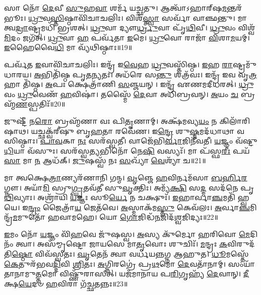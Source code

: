 𑌸𑌾 𑌨𑍋᳴ \ul{𑌦𑍇}\-𑌵𑍀 \ul{𑌸𑍁}\-𑌹\-\ul{𑌵𑌾} 𑌶𑌰𑍍𑌮᳴ 𑌯𑌚𑍍𑌛𑌤𑍁।
𑌆𑌤𑍍𑌵𑌾᳴\-𑌽𑌹𑌾𑌰𑍍‌\mbox{}𑌷\-\ul{𑌮}\-𑌨𑍍𑌤𑌰᳴𑌭𑍂𑌃।
\-\ul{𑌧𑍍𑌰𑍁}\-𑌵\-\ul{𑌸𑍍𑌤𑌿}\-𑌷𑍍𑌠𑌾𑌵𑌿᳴𑌚𑌾𑌚𑌲𑌿𑌃।
𑌵𑌿𑌶᳴\-\ul{𑌸𑍍𑌤𑍍𑌵𑌾} 𑌸𑌰𑍍𑌵𑌾᳴ 𑌵𑌾𑌞𑍍𑌛𑌨𑍍𑌤𑍁।
𑌮𑌾 𑌤𑍍𑌵\-\ul{𑌦𑍍𑌰𑌾}\-𑌷𑍍𑌟𑍍𑌰𑌮𑌧𑌿᳴ 𑌭𑍍𑌰𑌶𑌤𑍍।
\-\ul{𑌧𑍍𑌰𑍁}\-𑌵𑌾 𑌦𑍍𑌯𑍗\-\ul{𑌰𑍍𑌧𑍍𑌰𑍁}\-𑌵𑌾 𑌪𑍃᳴\-\ul{𑌥𑌿}\-𑌵𑍀।
\-\ul{𑌧𑍍𑌰𑍁}\-𑌵𑌂 𑌵𑌿𑌶𑍍𑌵᳴\-\ul{𑌮𑌿}\-𑌦𑌂 𑌜𑌗᳴𑌤𑍍।
\-\ul{𑌧𑍍𑌰𑍁}\-𑌵𑌾 \ul{𑌹} 𑌪𑌰𑍍𑌵᳴𑌤𑌾 \ul{𑌇}\-𑌮𑍇।
\-\ul{𑌧𑍍𑌰𑍁}\-𑌵𑍋 𑌰𑌾𑌜𑌾᳴ \ul{𑌵𑌿}\-𑌶𑌾\-\ul{𑌮}\-𑌯𑌮𑍍।
\-\ul{𑌇}\-𑌹𑍈𑌵𑍈\-\ul{𑌧𑌿} 𑌮𑌾 𑌵𑍍𑌯᳴𑌥𑌿𑌷𑍍𑌠𑌾𑌃॥19॥

𑌪𑌰𑍍𑌵᳴𑌤 \ul{𑌇}\-𑌵𑌾𑌵𑌿᳴𑌚𑌾𑌚𑌲𑌿𑌃।
𑌇𑌨𑍍𑌦𑍍𑌰᳴ 𑌇\-\ul{𑌵𑍇}\-𑌹 \ul{𑌧𑍍𑌰𑍁}\-𑌵𑌸𑍍𑌤𑌿᳴𑌷𑍍𑌠।
\-\ul{𑌇}\-𑌹 \ul{𑌰𑌾}\-𑌷𑍍𑌟𑍍𑌰𑌮𑍁᳴ 𑌧𑌾𑌰𑌯।
\-\ul{𑌅}\-𑌭𑌿𑌤𑌿᳴𑌷𑍍𑌠 𑌪𑍃𑌤\-\ul{𑌨𑍍𑌯}\-𑌤𑌃।
𑌅𑌧᳴𑌰𑍇 𑌸\-\ul{𑌨𑍍𑌤𑍁} 𑌶𑌤𑍍𑌰᳴𑌵𑌃।
𑌇𑌨𑍍𑌦𑍍𑌰᳴ 𑌇𑌵 𑌵𑍃\-\ul{𑌤𑍍𑌰}\-𑌹𑌾 𑌤𑌿᳴𑌷𑍍𑌠।
\-\ul{𑌅}\-𑌪𑌃 𑌕𑍍𑌷𑍇𑌤𑍍𑌰𑌾᳴𑌣𑌿 \ul{𑌸}\-𑌞𑍍𑌜𑌯𑌨𑍍।
𑌇𑌨𑍍𑌦𑍍𑌰᳴ 𑌏𑌣𑌮𑌦𑍀𑌧𑌰𑌤𑍍।
\-\ul{𑌧𑍍𑌰𑍁}\-𑌵𑌂 \ul{𑌧𑍍𑌰𑍁}\-𑌵𑍇𑌣᳴ \ul{𑌹}\-𑌵𑌿𑌷𑌾॑।
𑌤𑌸𑍍𑌮𑍈᳴ \ul{𑌦𑍇}\-𑌵𑌾 𑌅𑌧𑌿᳴𑌬𑍍𑌰𑌵𑌨𑍍।
\-\ul{𑌅}\-𑌯𑌂 \ul{𑌚} 𑌬𑍍𑌰𑌹𑍍𑌮᳴\-\ul{𑌣}\-𑌸𑍍𑌪𑌤𑌿𑌃᳴॥20॥\anuvakamend[\-\ul{𑌹}\-𑌵𑌿𑌰𑍍𑌭𑌿᳴\-\ul{𑌰𑌾}\-𑌸𑍍𑌯᳴𑌮\-\ul{𑌭𑌿} 𑌦𑌾𑌸᳴𑌤𑍋 𑌵𑌿\-\ul{𑌪}\-𑌶𑍍𑌚𑌿\-\ul{𑌤}\-𑌮𑌪𑍍𑌰᳴𑌯𑌾𑌵\-\ul{𑌞𑍍𑌜𑍀}\-𑌵\-\ul{𑌸𑍇} 𑌦𑌦𑌾᳴𑌨𑌾 𑌵𑍍𑌯𑌥𑌿𑌷𑍍𑌠𑌾 𑌬𑍍𑌰\-\ul{𑌵}\-𑌨𑍍𑌨𑍇𑌕𑌂᳴ 𑌚]

𑌜𑍁𑌷𑍍𑌟𑍀᳴ 𑌨\-\ul{𑌰𑍋} 𑌬𑍍𑌰𑌹𑍍𑌮᳴𑌣𑌾 𑌵𑌃 𑌪𑌿\-\ul{𑌤𑍃}\-𑌣𑌾𑌮𑍍।
𑌅𑌕𑍍𑌷᳴𑌮𑌵𑍍𑌯\-\ul{𑌯𑌂} 𑌨 𑌕𑌿𑌲𑌾᳴𑌰𑌿𑌷𑌾𑌥।
𑌯𑌚𑍍𑌛𑌕𑍍𑌵᳴𑌰𑍀𑌷𑍁 𑌬𑍃\-\ul{𑌹}\-𑌤𑌾 𑌰𑌵𑍇᳴𑌣।
𑌇\-\ul{𑌨𑍍𑌦𑍍𑌰𑍇} 𑌶𑍁\-\ul{𑌷𑍍𑌮}\-𑌮𑌦᳴𑌧𑌾𑌥𑌾 𑌵𑌸𑌿𑌷𑍍𑌠𑌾𑌃।
\-\ul{𑌪𑌾}\-\-\ul{𑌵}\-𑌕𑌾 \ul{𑌨𑌃} 𑌸𑌰᳴𑌸𑍍𑌵𑌤𑍀।
𑌵𑌾𑌜𑍇᳴𑌭𑌿\-\ul{𑌰𑍍𑌵𑌾}\-𑌜𑌿𑌨𑍀᳴𑌵𑌤𑍀।
\-\ul{𑌯}\-𑌜𑍍𑌞𑌂 𑌵᳴𑌷𑍍𑌟𑍁 \ul{𑌧𑌿}\-𑌯𑌾 𑌵᳴𑌸𑍁𑌃।
𑌸𑌰᳴𑌸𑍍𑌵\-\ul{𑌤𑍍𑌯}\-𑌭𑌿𑌨𑍋᳴ 𑌨𑍇\-\ul{𑌷𑌿} 𑌵𑌸𑍍𑌯𑌃᳴।
𑌮𑌾 𑌪᳴𑌸𑍍𑌫\-\ul{𑌰𑍀𑌃} 𑌪𑌯᳴\-\ul{𑌸𑌾} 𑌮𑌾 \ul{𑌨} 𑌆𑌧᳴𑌕𑍍।
\-\ul{𑌜𑍁}\-𑌷𑌸𑍍𑌵᳴ 𑌨𑌃 \ul{𑌸}\-𑌖𑍍𑌯𑌾᳴ \ul{𑌵𑍇}\-𑌶𑍍𑌯𑌾᳴ 𑌚॥21॥

𑌮𑌾 𑌤𑍍𑌵𑌕𑍍𑌷𑍇\-\ul{𑌤𑍍𑌰𑌾}\-𑌣𑍍𑌯𑌰᳴𑌣𑌾𑌨𑌿 𑌗𑌨𑍍𑌮।
\-\ul{𑌵𑍃}\-𑌞𑍍𑌜𑍇 \ul{𑌹}\-𑌵𑌿𑌰𑍍𑌨𑌮᳴𑌸𑌾 \ul{𑌬}\-\-\ul{𑌰𑍍}\-𑌹𑌿\-\ul{𑌰}\-𑌗𑍍𑌨𑍗।
𑌅𑌯𑌾᳴\-\ul{𑌮𑌿} 𑌸𑍍𑌰𑍁\-\ul{𑌗𑍍𑌘𑍃}\-𑌤𑌵᳴𑌤𑍀 𑌸𑍁\-\ul{𑌵𑍃}\-𑌕𑍍𑌤𑌿𑌃।
𑌅𑌮𑍍𑌯᳴\-\ul{𑌕𑍍𑌷𑌿} 𑌸\-\ul{𑌦𑍍𑌮} 𑌸𑌦᳴𑌨𑍇 𑌪𑍃\-\ul{𑌥𑌿}\-𑌵𑍍𑌯𑌾𑌃।
𑌅𑌶𑍍𑌰𑌾᳴𑌯𑌿 \ul{𑌯}\-𑌜𑍍𑌞𑌃 𑌸𑍂\-\ul{𑌰𑍍𑌯𑍇} 𑌨 𑌚𑌕𑍍𑌷𑍁𑌃᳴।
\-\ul{𑌇}\-𑌹𑌾𑌰𑍍𑌵𑌾\-\ul{𑌞𑍍𑌚}\-𑌮𑌤𑌿᳴ 𑌹𑍍𑌵𑌯𑍇।
𑌇\-\ul{𑌨𑍍𑌦𑍍𑌰𑌂} 𑌜𑍈𑌤𑍍𑌰𑌾᳴\-\ul{𑌯} 𑌜𑍇𑌤᳴𑌵𑍇।
\-\ul{𑌅}\-𑌸𑍍𑌮𑌾𑌕᳴𑌮\-\ul{𑌸𑍍𑌤𑍁} 𑌕𑍇𑌵᳴𑌲𑌃।
\-\ul{𑌅}\-𑌰𑍍𑌵𑌾\-\ul{𑌞𑍍𑌚}\-𑌮𑌿𑌨𑍍𑌦𑍍𑌰᳴\-\ul{𑌮}\-𑌮𑍁𑌤𑍋᳴ 𑌹𑌵𑌾𑌮𑌹𑍇।
𑌯𑍋 \ul{𑌗𑍋}\-𑌜𑌿𑌦𑍍𑌧᳴\-\ul{𑌨}\-𑌜𑌿𑌦᳴\-\ul{𑌶𑍍𑌵}\-\-𑌜𑌿𑌦𑍍𑌯𑌃॥22॥

\-\ul{𑌇}\-𑌮𑌂 𑌨𑍋᳴ \ul{𑌯}\-𑌜𑍍𑌞𑌂 𑌵𑌿᳴\-\ul{𑌹}\-𑌵𑍇 𑌜𑍁᳴𑌷𑌸𑍍𑌵।
\-\ul{𑌅}\-𑌸𑍍𑌯 𑌕𑍁᳴𑌰𑍍𑌮𑍋 𑌹𑌰𑌿𑌵𑍋 \ul{𑌮𑍇}\-𑌦𑌿𑌨𑌂᳴ 𑌤𑍍𑌵𑌾।
𑌅𑌸᳴𑌮𑍍𑌮𑍃𑌷𑍍𑌟𑍋 𑌜𑌾𑌯𑌸𑍇 𑌮𑌾\-\ul{𑌤𑍃}\-𑌵𑍋𑌃 𑌶𑍁𑌚𑌿𑌃᳴।
\-\ul{𑌮}\-𑌨𑍍𑌦𑍍𑌰𑌃 \ul{𑌕}\-𑌵𑌿𑌰𑍁𑌦᳴𑌤𑌿\-\ul{𑌷𑍍𑌠𑍋} 𑌵𑌿𑌵᳴𑌸𑍍𑌵𑌤𑌃।
\-\ul{𑌘𑍃}\-𑌤𑍇𑌨᳴ 𑌤𑍍𑌵𑌾 𑌵𑌰𑍍𑌧𑌯𑌨𑍍𑌨𑌗𑍍𑌨 𑌆𑌹𑍁𑌤।
\-\ul{𑌧𑍂}\-𑌮𑌸𑍍𑌤𑍇᳴ \ul{𑌕𑍇}\-𑌤𑍁𑌰᳴𑌭𑌵\-\ul{𑌦𑍍𑌦𑌿}\-𑌵𑌿 \ul{𑌶𑍍𑌰𑌿}\-𑌤𑌃।
\-\ul{𑌅}\-𑌗𑍍𑌨𑌿𑌰𑌗𑍍𑌰𑍇॑ 𑌪𑍍𑌰\-\ul{𑌥}\-𑌮𑍋 \ul{𑌦𑍇}\-𑌵𑌤𑌾᳴𑌨𑌾𑌮𑍍।
𑌸𑌂𑌯𑌾᳴𑌤𑌾𑌨𑌾𑌮𑍁\-\ul{𑌤𑍍𑌤}\-𑌮𑍋 𑌵𑌿𑌷𑍍𑌣𑍁᳴𑌰𑌾𑌸𑍀𑌤𑍍।
𑌯𑌜᳴𑌮𑌾𑌨𑌾𑌯 𑌪\-\ul{𑌰𑌿}\-𑌗𑍃𑌹𑍍𑌯᳴ \ul{𑌦𑍇}\-𑌵𑌾𑌨𑍍।
\-\ul{𑌦𑍀}\-𑌕𑍍𑌷\-\ul{𑌯𑍇}\-𑌦𑍞 \ul{𑌹}\-𑌵𑌿𑌰𑌾 𑌗᳴𑌚𑍍𑌛𑌤𑌨𑍍𑌨𑌃॥23॥

